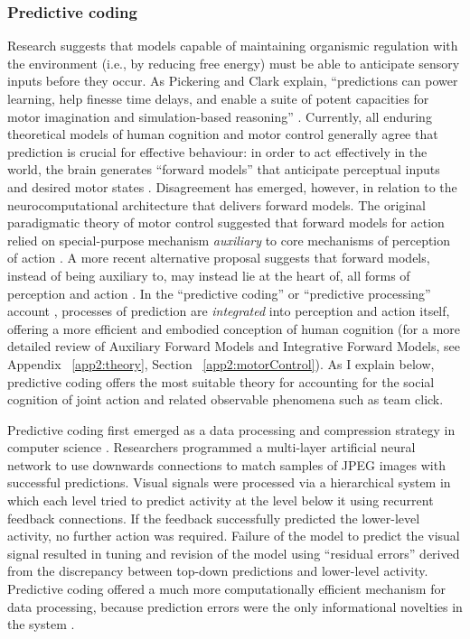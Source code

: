 \begin{CJK}{UTF8}{gbsn}
\subsubsection{Predictive coding}
Research suggests that models capable of maintaining organismic regulation with the environment (i.e., by reducing free energy) must be able to anticipate sensory inputs before they occur. As Pickering and Clark explain, ``predictions can power learning, help finesse time delays, and enable a suite of potent capacities for motor imagination and simulation-based reasoning'' \citep[6]{Pickering2014}.  Currently, all enduring theoretical models of human cognition and motor control generally agree that prediction is crucial for effective behaviour: in order to act effectively in the world, the brain generates ``forward models'' that anticipate perceptual inputs and desired motor states \citep{Pickering2014}.  Disagreement has emerged, however, in relation to the neurocomputational architecture that delivers forward models.  The original paradigmatic theory of motor control suggested that forward models for action relied on special-purpose mechanism \textit{auxiliary} to core mechanisms of perception of action \citep{Wolpert1997}.  A more recent alternative proposal suggests that forward models, instead of being auxiliary to, may instead lie at the heart of, all forms of perception and action \citep{Friston2010}.  In the ``predictive coding'' \citep{Rao1999} or ``predictive processing'' account \citep{Clark2013}, processes of prediction are \textit{integrated} into perception and action itself, offering a more efficient and embodied conception of human cognition (for a more detailed review of Auxiliary Forward Models and Integrative Forward Models, see Appendix ~\ref{app2:theory}, Section ~\ref{app2:motorControl}). As I explain below, predictive coding offers the most suitable theory for accounting for the social cognition of joint action and related observable phenomena such as team click.

Predictive coding first emerged as a data processing and compression strategy in computer science \citep{Rao1999}.  Researchers programmed a multi-layer artificial neural network to use downwards connections to match samples of JPEG images with successful predictions. Visual signals were processed via a hierarchical system in which each level tried to predict activity at the level below it using recurrent feedback connections. If the feedback successfully predicted the lower-level activity, no further action was required. Failure of the model to predict the visual signal resulted in tuning and revision of the model using ``residual errors'' derived from the discrepancy between top-down predictions and lower-level activity.  Predictive coding offered a much more computationally efficient mechanism for data processing, because prediction errors were the only informational novelties in the system \citep{Clark2015}.


\end{CJK}
